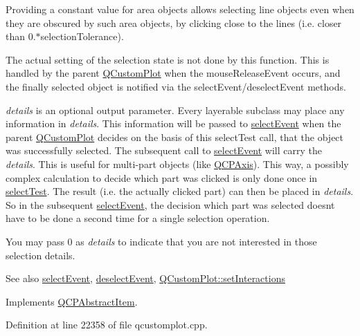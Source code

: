 Providing a constant value for area objects allows selecting line objects even when they are obscured by such area objects, by clicking close to the lines (i.\+e. closer than 0.$\ast$selection\+Tolerance).

The actual setting of the selection state is not done by this function. This is handled by the parent \hyperlink{class_q_custom_plot}{Q\+Custom\+Plot} when the mouse\+Release\+Event occurs, and the finally selected object is notified via the select\+Event/deselect\+Event methods.

{\itshape details} is an optional output parameter. Every layerable subclass may place any information in {\itshape details}. This information will be passed to \hyperlink{class_q_c_p_abstract_item_aaf92af7b9893712959a6c073d334d88d}{select\+Event} when the parent \hyperlink{class_q_custom_plot}{Q\+Custom\+Plot} decides on the basis of this select\+Test call, that the object was successfully selected. The subsequent call to \hyperlink{class_q_c_p_abstract_item_aaf92af7b9893712959a6c073d334d88d}{select\+Event} will carry the {\itshape details}. This is useful for multi-\/part objects (like \hyperlink{class_q_c_p_axis}{Q\+C\+P\+Axis}). This way, a possibly complex calculation to decide which part was clicked is only done once in \hyperlink{class_q_c_p_item_text_a285b95bb6634c2e4f7768abb7a8bc69c}{select\+Test}. The result (i.\+e. the actually clicked part) can then be placed in {\itshape details}. So in the subsequent \hyperlink{class_q_c_p_abstract_item_aaf92af7b9893712959a6c073d334d88d}{select\+Event}, the decision which part was selected doesn\textquotesingle{}t have to be done a second time for a single selection operation.

You may pass 0 as {\itshape details} to indicate that you are not interested in those selection details.

\begin{DoxySeeAlso}{See also}
\hyperlink{class_q_c_p_abstract_item_aaf92af7b9893712959a6c073d334d88d}{select\+Event}, \hyperlink{class_q_c_p_abstract_item_a91f090d6763cfedb0749219c63788ae9}{deselect\+Event}, \hyperlink{class_q_custom_plot_a5ee1e2f6ae27419deca53e75907c27e5}{Q\+Custom\+Plot\+::set\+Interactions} 
\end{DoxySeeAlso}


Implements \hyperlink{class_q_c_p_abstract_item_a96d522d10ffc0413b9a366c6f7f0476b}{Q\+C\+P\+Abstract\+Item}.



Definition at line 22358 of file qcustomplot.\+cpp.



